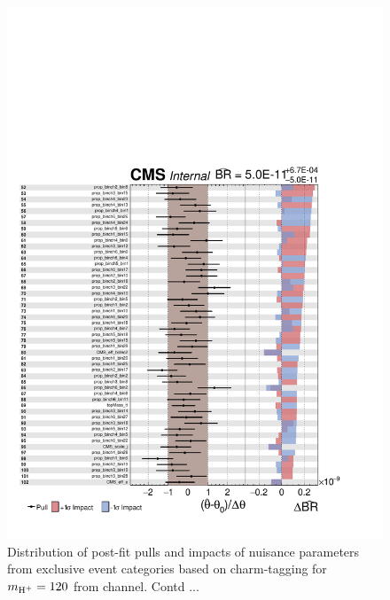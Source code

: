\begin{figure}
\begin{center}
\includegraphics[width=1.0\textwidth]{Image/MLFit/ImpactNuis/nuisImpact2.pdf}
 \caption{Distribution of post-fit pulls and impacts of nuisance parameters from
     exclusive event categories based on charm-tagging for $m_{\text{H}^+}=120$
     \GeV from \ljets channel. Contd ...}
\label{fig:nuisImpact2}
\end{center}
\end{figure}

